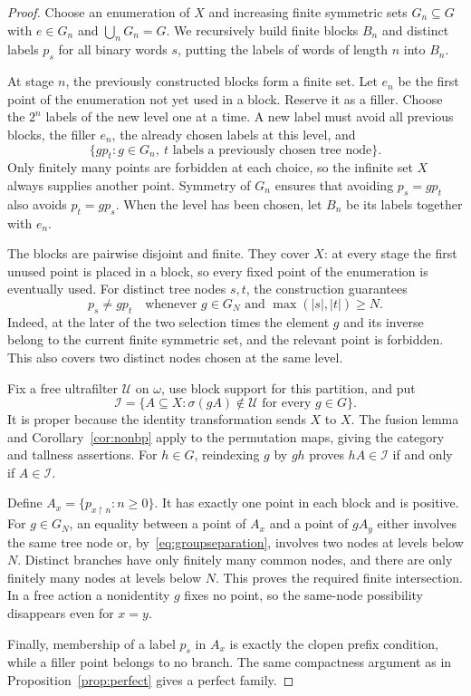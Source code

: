 \documentclass[11pt,a4paper]{article}
\theoremstyle{definition}
\theoremstyle{remark}
\newcommand{\I}{\mathcal I}
\newcommand{\U}{\mathcal U}
\newcommand{\supp}{\sigma}
\newcommand{\restr}{\mathbin{\upharpoonright}}
\begin{document}
\begin{proof}
Choose an enumeration of $X$ and increasing finite symmetric sets
$G_n\subseteq G$ with $e\in G_n$ and $\bigcup_nG_n=G$.
We recursively build finite blocks $B_n$ and distinct labels $p_s$ for
all binary words $s$, putting the labels of words of length $n$ into
$B_n$.

At stage $n$, the previously constructed blocks form a finite set.
Let $e_n$ be the first point of the enumeration not yet used in a block.
Reserve it as a filler. Choose the $2^n$ labels of the new level one at
a time. A new label must avoid all previous blocks, the filler $e_n$,
the already chosen labels at this level, and
\[
              \{g p_t:g\in G_n,\ t\text{ labels a previously
                                      chosen tree node}\}.
\]
Only finitely many points are forbidden at each choice, so the infinite
set $X$ always supplies another point. Symmetry of $G_n$ ensures that
avoiding $p_s=g p_t$ also avoids $p_t=g p_s$. When the level has been
chosen, let $B_n$ be its labels together with $e_n$.

The blocks are pairwise disjoint and finite. They cover $X$: at every
stage the first unused point is placed in a block, so every fixed point
of the enumeration is eventually used. For distinct tree nodes $s,t$,
the construction guarantees
\begin{equation}
\label{eq:groupseparation}
 p_s\ne g p_t
 \quad\text{whenever }g\in G_N
                    \text{ and }\max(|s|,|t|)\ge N.
\end{equation}
Indeed, at the later of the two selection times the element $g$ and its
inverse belong to the current finite symmetric set, and the relevant
point is forbidden. This also covers two distinct nodes chosen at the
same level.

Fix a free ultrafilter $\U$ on $\omega$, use block support for this
partition, and put
\[
            \I=\{A\subseteq X:\supp(gA)\notin\U
                                           \text{ for every }g\in G\}.
\]
It is proper because the identity transformation sends $X$ to $X$.
The fusion lemma and Corollary~\ref{cor:nonbp} apply to the permutation
maps, giving the category and tallness assertions. For $h\in G$,
reindexing $g$ by $gh$ proves $hA\in\I$ if and only if $A\in\I$.

Define $A_x=\{p_{x\restr n}:n\ge0\}$. It has exactly one point in each
block and is positive. For $g\in G_N$, an equality between a point of
$A_x$ and a point of $gA_y$ either involves the same tree node or,
by~\eqref{eq:groupseparation}, involves two nodes at levels below $N$.
Distinct branches have only finitely many common nodes, and there are
only finitely many nodes at levels below $N$. This proves the required
finite intersection. In a free action a nonidentity $g$ fixes no point,
so the same-node possibility disappears even for $x=y$.

Finally, membership of a label $p_s$ in $A_x$ is exactly the clopen
prefix condition, while a filler point belongs to no branch. The same
compactness argument as in Proposition~\ref{prop:perfect} gives a
perfect family.
\end{proof}
\end{document}
